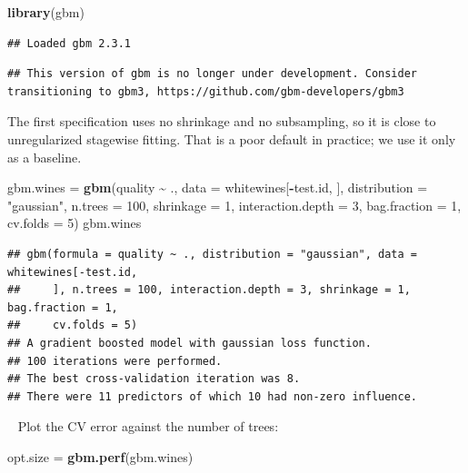\documentclass[
]{book}
\newenvironment{Shaded}{\begin{snugshade}}{\end{snugshade}}
\newcommand{\AttributeTok}[1]{\textcolor[rgb]{0.13,0.29,0.53}{#1}}
\newcommand{\DecValTok}[1]{\textcolor[rgb]{0.00,0.00,0.81}{#1}}
\newcommand{\FunctionTok}[1]{\textcolor[rgb]{0.13,0.29,0.53}{\textbf{#1}}}
\newcommand{\NormalTok}[1]{#1}
\newcommand{\OtherTok}[1]{\textcolor[rgb]{0.56,0.35,0.01}{#1}}
\newcommand{\SpecialCharTok}[1]{\textcolor[rgb]{0.81,0.36,0.00}{\textbf{#1}}}
\newcommand{\StringTok}[1]{\textcolor[rgb]{0.31,0.60,0.02}{#1}}
\begin{document}
\begin{Shaded}
\begin{Highlighting}[]
\FunctionTok{library}\NormalTok{(gbm)}
\end{Highlighting}
\end{Shaded}

\begin{verbatim}
## Loaded gbm 2.3.1
\end{verbatim}

\begin{verbatim}
## This version of gbm is no longer under development. Consider transitioning to gbm3, https://github.com/gbm-developers/gbm3
\end{verbatim}

The first specification uses no shrinkage and no subsampling, so it is close to unregularized stagewise fitting. That is a poor default in practice; we use it only as a baseline.

\begin{Shaded}
\begin{Highlighting}[]
\NormalTok{gbm.wines }\OtherTok{=} \FunctionTok{gbm}\NormalTok{(quality }\SpecialCharTok{\textasciitilde{}}\NormalTok{ ., }\AttributeTok{data =}\NormalTok{ whitewines[}\SpecialCharTok{{-}}\NormalTok{test.id, ], }\AttributeTok{distribution =} \StringTok{"gaussian"}\NormalTok{,}
    \AttributeTok{n.trees =} \DecValTok{100}\NormalTok{, }\AttributeTok{shrinkage =} \DecValTok{1}\NormalTok{, }\AttributeTok{interaction.depth =} \DecValTok{3}\NormalTok{, }\AttributeTok{bag.fraction =} \DecValTok{1}\NormalTok{,}
    \AttributeTok{cv.folds =} \DecValTok{5}\NormalTok{)}
\NormalTok{gbm.wines}
\end{Highlighting}
\end{Shaded}

\begin{verbatim}
## gbm(formula = quality ~ ., distribution = "gaussian", data = whitewines[-test.id, 
##     ], n.trees = 100, interaction.depth = 3, shrinkage = 1, bag.fraction = 1, 
##     cv.folds = 5)
## A gradient boosted model with gaussian loss function.
## 100 iterations were performed.
## The best cross-validation iteration was 8.
## There were 11 predictors of which 10 had non-zero influence.
\end{verbatim}

~
Plot the CV error against the number of trees:

\begin{Shaded}
\begin{Highlighting}[]
\NormalTok{opt.size }\OtherTok{=} \FunctionTok{gbm.perf}\NormalTok{(gbm.wines)}
\end{Highlighting}
\end{Shaded}
\end{document}
